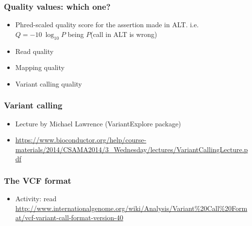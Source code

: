 \documentclass{beamer}
\begin{document}
\begin{frame}
  \frametitle{Quality values: which one?}

  \begin{itemize}
  \item Phred-scaled quality score for the assertion made in ALT. i.e. $Q = -10 \ \log_{10} P$  being $P$(call in ALT is wrong)
  \item Read quality
  \item Mapping quality
  \item Variant calling quality
  \end{itemize}
\end{frame}





\begin{frame}
  \frametitle{Variant calling}
  \begin{itemize}
  \item Lecture by Michael Lawrence (VariantExplore package)
  \item \url{https://www.bioconductor.org/help/course-materials/2014/CSAMA2014/3_Wednesday/lectures/VariantCallingLecture.pdf}
  \end{itemize}
\end{frame}



\begin{frame}
  \frametitle{The VCF format}
  \begin{itemize}
  \item Activity: read \url{http://www.internationalgenome.org/wiki/Analysis/Variant\%20Call\%20Format/vcf-variant-call-format-version-40}
  \end{itemize}
\end{frame}







\end{document}

